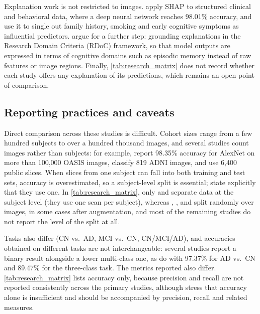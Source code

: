 Explanation work is not restricted to images. \textcite{ullah2026explainable}
apply SHAP to structured clinical and behavioral data, where a deep neural network
reaches 98.01\% accuracy, and use it to single out family history, smoking and
early cognitive symptoms as influential predictors. \textcite{nami2026rdocinformed}
argue for a further step: grounding explanations in the Research Domain Criteria
(RDoC) framework, so that model outputs are expressed in terms of cognitive
domains such as episodic memory instead of raw features or image regions.
Finally, \cref{tab:research_matrix} does not record whether each study offers any
explanation of its predictions, which remains an open point of comparison.

\subsection{Reporting practices and caveats}
\label{sec:rw_caveats}

Direct comparison across these studies is difficult. Cohort sizes range from a
few hundred subjects to over a hundred thousand images, and several studies count
images rather than subjects: for example, \textcite{sathishkumar2022alexnet} report
98.35\% accuracy for AlexNet on more than 100,000 OASIS images,
\textcite{deepa2022optimization} classify 819 ADNI images, and
\textcite{elmotelb2025novel} use 6,400 public slices. When slices from one subject
can fall into both training and test sets, accuracy is overestimated, so a
subject-level split is essential; \textcite{zhao2024vision} state explicitly that
they use one. In \cref{tab:research_matrix}, only \textcite{ebrahimi2021deep} and
\textcite{kong2022multimodal} separate data at the subject level (they use one scan
per subject), whereas \textcite{janghel2021deep}, \textcite{liu2021alzheimers},
\textcite{deepa2022optimization} and \textcite{helaly2022deep} split randomly over
images, in some cases after augmentation, and most of the remaining studies do not
report the level of the split at all.

Tasks also differ (CN vs.\ AD, MCI vs.\ CN, CN/MCI/AD), and accuracies obtained
on different tasks are not interchangeable: several studies report a binary result
alongside a lower multi-class one, as \textcite{li2020detecting} do with 97.37\% for
AD vs.\ CN and 89.47\% for the three-class task. The metrics reported also differ.
\cref{tab:research_matrix} lists accuracy only, because precision and recall are
not reported consistently across the primary studies, although
\textcite{nibila2026artificial} stress that accuracy alone is insufficient and
should be accompanied by precision, recall and related measures.
